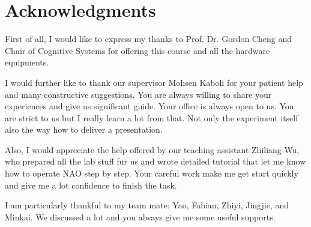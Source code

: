 \documentclass[ICS, PP, english, final]{ICS_thesis}
\begin{document}
\pagestyle{fancy}

\tableofcontents






% 	

\chapter*{Acknowledgments}
First of all, I would like to express my thanks to Prof. Dr. Gordon Cheng and Chair of Cognitive Systems for offering this course and all the hardware equipments.

I would further like to thank our supervisor Mohsen Kaboli for your patient help and many constructive suggestions. You are always willing to share your experiences and give us significant guide. Your office is always open to us. You are strict to us but I really learn a lot from that. Not only the experiment itself also the way how to deliver a presentation.

Also, I would appreciate the help offered by our teaching assistant Zhiliang Wu, who prepared all the lab stuff fur us and wrote detailed tutorial that let me know how to operate NAO step by step. Your careful work make me get start quickly and give me a lot confidence to finish the task. 

I am particularly thankful to my team mate: Yao, Fabian, Zhiyi, Jingjie, and Minkai. We discussed a lot and you always give me some useful supports.

\cleardoublepage
{}
\listoffigures

% 

\cleardoublepage
{}



\end{document}
